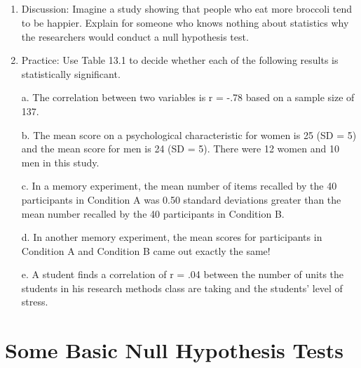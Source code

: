\subsection{}
\begin{fullwidth}
\begin{enumerate}
\item Discussion: Imagine a study showing that people who eat more broccoli tend to be happier. Explain for someone who knows nothing about statistics why the researchers would conduct a null hypothesis test.

\item Practice: Use Table 13.1 to decide whether each of the following results is statistically significant.

a. The correlation between two variables is r = -.78 based on a sample size of 137.

b. The mean score on a psychological characteristic for women is 25 (SD = 5) and the mean score for men is 24 (SD = 5). There were 12 women and 10 men in this study.

c. In a memory experiment, the mean number of items recalled by the 40 participants in Condition A was 0.50 standard deviations greater than the mean number recalled by the 40 participants in Condition B.

d. In another memory experiment, the mean scores for participants in Condition A and Condition B came out exactly the same!

e. A student finds a correlation of r = .04 between the number of units the students in his research methods class are taking and the students' level of stress.
  
\end{enumerate}
\end{fullwidth}  

\section{Some Basic Null Hypothesis Tests}



    
